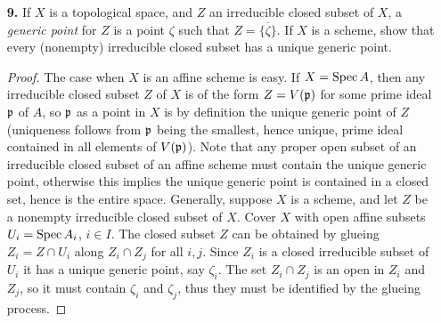 \documentclass{article}
\begin{document}
\begin{enumerate} [label=\textbf{\arabic*.}, leftmargin=0em]
\begin{proof}
    We first identify the prime ideals of $k[\varepsilon] / (\varepsilon^2)$ and determine the topology of $\spec{k[\varepsilon] / (\varepsilon^2)}$. The only prime ideal is $(\varepsilon)$, in particular it is a local ring with nilpotent elements, so $\spec{k[\varepsilon] / (\varepsilon^2)}$ has only one point. We have the canonical projection $k[\varepsilon] / (\varepsilon^2) \to k$, which given a morphism of schemes $d : \spec{k[\varepsilon] / (\varepsilon^2)} \to X$ induces
    \begin{equation*}
        \spec{k} \to \spec{k[\varepsilon] / (\varepsilon^2)} \to X.
    \end{equation*}
    By Exercise 7, this is equivalent to giving a point $x \in X$ and an inclusion of fields $k(x) \hookrightarrow k$. Also, any $d$ induces a morphism between tangent spaces $$d^* : T_{(\varepsilon)}(\spec{k[\varepsilon]/(\varepsilon^2)}) \to T_x(X),$$
    and since $T_{(\varepsilon)}(\spec{k[\varepsilon]/(\varepsilon^2)})$ is a one-dimensional $k$-vector space, a linear map such as $d^*$ is equivalent to giving an element of $T_x(X)$.
\end{proof}

\item[\textbf{9.}] If $X$ is a topological space, and $Z$ an irreducible closed subset of $X$, a \textit{generic point} for $Z$ is a point $\zeta$ such that $Z = \overline{\{ \zeta \} }$. If $X$ is a scheme, show that every (nonempty) irreducible closed subset has a unique generic point.

\begin{proof}
   The case when $X$ is an affine scheme is easy. If $X = \operatorname{Spec}{A}$, then any irreducible closed subset $Z$ of $X$ is of the form $Z = V(\mathfrak{p})$ for some prime ideal $\mathfrak{p}$ of $A$, so $\mathfrak{p}$ as a point in $X$ is by definition the unique generic point of $Z$ (uniqueness follows from $\mathfrak{p}$ being the smallest, hence unique, prime ideal contained in all elements of $V(\mathfrak{p})$). Note that any proper open subset of an irreducible closed subset of an affine scheme must contain the unique generic point, otherwise this implies the unique generic point is contained in a closed set, hence is the entire space. Generally, suppose $X$ is a scheme, and let $Z$ be a nonempty irreducible closed subset of $X$. Cover $X$ with open affine subsets $U_i = \operatorname{Spec}{A_i}$, $i \in I$. The closed subset $Z$ can be obtained by glueing $Z_i = Z \cap U_i$ along $Z_i \cap Z_j$ for all $i, j$. Since $Z_i$ is a closed irreducible subset of $U_i$ it has a unique generic point, say $\zeta_i$. The set $Z_i \cap Z_j$ is an open in $Z_i$ and $Z_j$, so it must contain $\zeta_i$ and $\zeta_j$, thus they must be identified by the glueing process.
\end{proof}


\end{enumerate}
\end{document}
